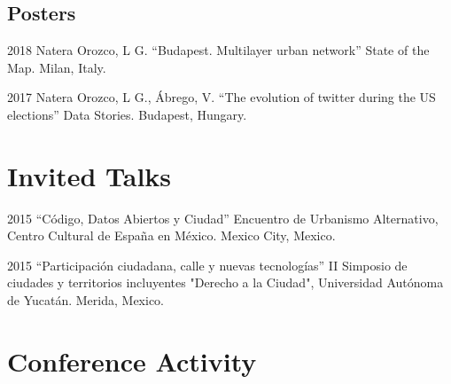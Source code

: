 \documentclass{academiccv}
\begin{document}


	

\subsection*{Posters}

\begin{tablist}
	
	\item[2018] \tab Natera Orozco, L G. \enquote{Budapest. Multilayer urban network} State of the Map. Milan, Italy.
	\item[2017] \tab Natera Orozco, L G., Ábrego, V. \enquote{The evolution of twitter during the US elections} Data Stories. Budapest, Hungary.
	
\end{tablist}


\section*{Invited Talks}

\begin{tablist}

\item[2015] \tab \enquote{Código, Datos Abiertos y Ciudad} Encuentro de Urbanismo Alternativo, Centro Cultural de España en México. Mexico City, Mexico.

\item[2015] \tab \enquote{Participación ciudadana, calle y nuevas tecnologías} II Simposio de ciudades y territorios incluyentes "Derecho a la Ciudad", Universidad Autónoma de Yucatán. Merida, Mexico.


\end{tablist}



\section*{Conference Activity}
\end{document}
